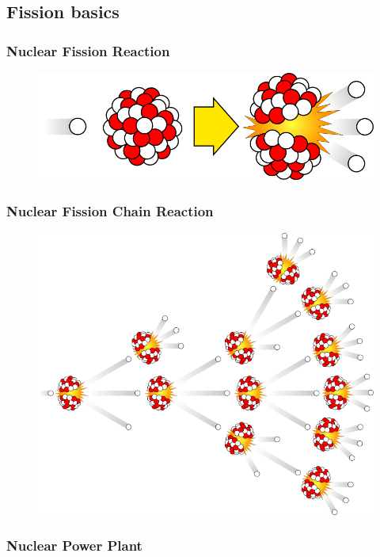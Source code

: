 \subsection{Fission basics}
\begin{frame}
  \frametitle{Nuclear Fission Reaction}
               \begin{figure}[t]
                \vspace*{-0.1in}
			\hspace*{-0.35in}
                \includegraphics[height=0.25\textwidth]{./images/800px-Fission.png}
               \end{figure}            
\end{frame}

\begin{frame}
  \frametitle{Nuclear Fission Chain Reaction}
               \begin{figure}[t]
                \vspace*{-0.1in}
			\hspace*{-0.35in}
                \includegraphics[height=0.7\textwidth]{./images/715px-Chainreaction.png}
               \end{figure}            
\end{frame}

\begin{frame}
  \frametitle{Nuclear Power Plant}
\end{frame}

